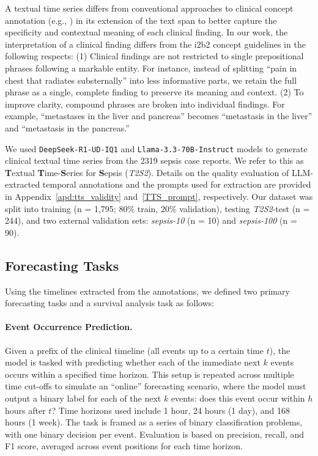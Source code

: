 \documentclass[letterpaper]{article} %
\begin{document}
A textual time series differs from conventional approaches to clinical concept annotation (e.g., \cite{sun2013evaluating,uzuner20112010}) in its extension of the text span to better capture the specificity and contextual meaning of each clinical finding. In our work, the interpretation of a clinical finding differs from the i2b2 concept guidelines in the following respects: (1) Clinical findings are not restricted to single prepositional phrases following a markable entity. For instance, instead of splitting “pain in chest that radiates substernally” into less informative parts, we retain the full phrase as a single, complete finding to preserve its meaning and context. (2) To improve clarity, compound phrases are broken into individual findings. For example, “metastases in the liver and pancreas” becomes “metastasis in the liver” and “metastasis in the pancreas.”

We used \texttt{DeepSeek-R1-UD-IQ1} and \texttt{Llama-3.3-70B-Instruct} models to generate clinical textual time series from the 2319 sepsis case reports. We refer to this as \textbf{T}extual \textbf{T}ime-\textbf{S}eries for \textbf{S}epsis (\textit{T2S2}).
Details on the quality evaluation of LLM-extracted temporal annotations and the prompts used for extraction are provided in Appendix~\ref{apd:tts_validity} and~\ref{TTS_prompt}, respectively.
Our dataset was split into training (n = 1,795; 80\% train, 20\% validation), testing \textit{T2S2}-test (n = 244), and two external validation sets: \textit{sepsis-10} (n = 10) and \textit{sepsis-100} (n = 90).

\subsection{Forecasting Tasks}
Using the timelines extracted from the annotations, we defined two primary forecasting tasks and a survival analysis task as follows:

\paragraph{Event Occurrence Prediction.} 
Given a prefix of the clinical timeline (all events up to a certain time $t$), the model is tasked with predicting whether each of the immediate next $k$ events occurs within a specified time horizon. 
This setup is repeated across multiple time cut-offs to simulate an “online” forecasting scenario, where the model must output a binary label for each of the next $k$ events:
does this event occur within $h$ hours after $t$? 
Time horizons used include 1 hour, 24 hours (1 day), and 168 hours (1 week). 
The task is framed as a series of binary classification problems, with one binary decision per event. 
Evaluation is based on precision, recall, and F1 score, averaged across event positions for each time horizon.
\end{document}
